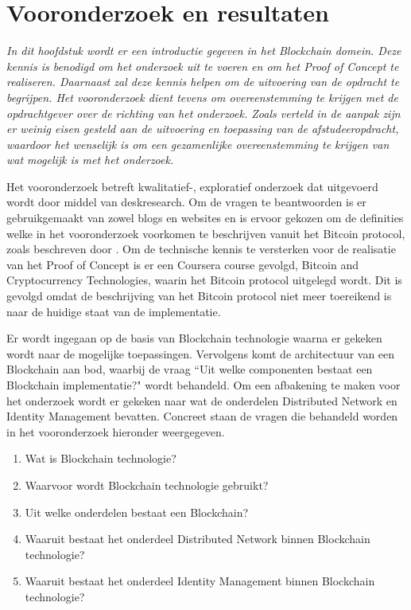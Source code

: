 \chapter{Vooronderzoek en resultaten}

\textit{In dit hoofdstuk wordt er een introductie gegeven in het Blockchain domein. Deze kennis is benodigd om het onderzoek uit te voeren en om het Proof of Concept te realiseren. Daarnaast zal deze kennis helpen om de uitvoering van de opdracht te begrijpen. Het vooronderzoek dient tevens om overeenstemming te krijgen met de opdrachtgever over de richting van het onderzoek. Zoals verteld in de aanpak zijn er weinig eisen gesteld aan de uitvoering en toepassing van de afstudeeropdracht, waardoor het wenselijk is om een gezamenlijke overeenstemming te krijgen van wat mogelijk is met het onderzoek.}

Het vooronderzoek betreft kwalitatief-, exploratief onderzoek dat uitgevoerd wordt door middel van deskresearch. Om de vragen te beantwoorden is er gebruikgemaakt van zowel blogs en websites en is ervoor gekozen om de definities welke in het vooronderzoek voorkomen te beschrijven vanuit het Bitcoin protocol, zoals beschreven door \cite{nakamoto2008bitcoin}. Om de technische kennis te versterken voor de realisatie van het Proof of Concept is er een Coursera course gevolgd, Bitcoin and Cryptocurrency Technologies, waarin het Bitcoin protocol uitgelegd wordt. Dit is gevolgd omdat de beschrijving van het Bitcoin protocol niet meer toereikend is naar de huidige staat van de implementatie.

Er wordt ingegaan op de basis van Blockchain technologie waarna er gekeken wordt naar de mogelijke toepassingen. Vervolgens komt de architectuur van een Blockchain aan bod, waarbij de vraag ``Uit welke componenten bestaat een Blockchain implementatie?" wordt behandeld. Om een afbakening te maken voor het onderzoek wordt er gekeken naar wat de onderdelen Distributed Network en Identity Management bevatten. Concreet staan de vragen die behandeld worden in het vooronderzoek hieronder weergegeven.

\begin{enumerate}[noitemsep]
  \item Wat is Blockchain technologie?
  \item Waarvoor wordt Blockchain technologie gebruikt?
  \item Uit welke onderdelen bestaat een Blockchain?
  \item Waaruit bestaat het onderdeel Distributed Network binnen Blockchain technologie?
  \item Waaruit bestaat het onderdeel Identity Management binnen Blockchain technologie?
\end{enumerate}

